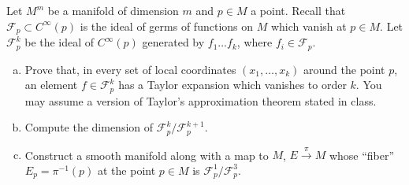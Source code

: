 \documentclass{article}
\newenvironment{problem}[2][Problem]{\begin{trivlist}
\item[\hskip \labelsep {\bfseries #1}\hskip \labelsep {\bfseries #2.}]}{\end{trivlist}}
\begin{document}
\begin{problem}{2}
  Let $M^m$ be a manifold of dimension $m$ and $p \in M$ a point. Recall that
  $\mathcal{F}_p \subset C^\infty(p)$ is the ideal of germs of functions on $M$
  which vanish at $p \in M$. Let $\mathcal{F}_p^k$ be the ideal of $C^\infty(p)$
  generated by $f_1 \hdots f_k$, where $f_i \in \mathcal{F}_p$.
  \begin{enumerate}[(a)]
    \item
      Prove that, in every set of local coordinates $(x_1, \hdots , x_k)$
      around the point $p$, an element $f \in \mathcal{F}^k_p$ has a Taylor
      expansion which vanishes to order $k$. You may assume a version of
      Taylor’s approximation theorem stated in class.
    \item Compute the dimension of $\mathcal{F}_p^k/\mathcal{F}_p^{k+1}$.
    \item Construct a smooth manifold along with a map to $M$,
    $E \xrightarrow{\pi} M$ whose ``fiber'' $E_p = \pi^{-1}(p)$ at the point
    $p \in M$ is $\mathcal{F}_p^1/\mathcal{F}_p^3$.
  \end{enumerate}
\end{problem}
\end{document}
